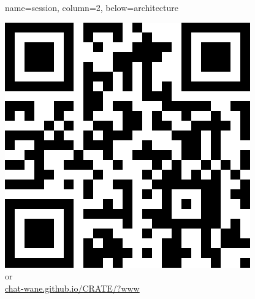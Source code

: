 \documentclass[a1paper, fontscale=0.35, portrait]{baposter}
\begin{document}
\begin{poster}
{  }

  {name=session, column=2, below=architecture} {
    \begin{center}
      \includegraphics[scale=0.25]{img/qrcode.png}
      \\or\\
      \url{chat-wane.github.io/CRATE/?www}
    \end{center}
  }

\end{poster}
\end{document}
